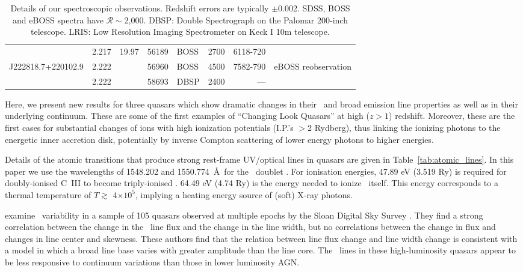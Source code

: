 \documentclass[fleqn,usenatbib]{mnras}
\begin{document}
\begin{table}
\begin{tabular}{l l   r ll  r r l}
                                      & 2.217                               & 19.97          &  56189                    &  BOSS                                    &  2700            &   6118-720          & \\
 J222818.7+220102.9   & 2.222                               &                    &  56960                     & BOSS                                    &  4500            &   7582-790          & eBOSS reobservation \\ 
                                     &  2.222                               &                    &  58693                    &  DBSP                                    & 2400             &    ---                        &    \\
    \hline \hline   
  \end{tabular}
  \caption{Details of our spectroscopic observations.  Redshift errors are
    typically $\pm$0.002.  SDSS, BOSS and eBOSS spectra have
    $\mathcal{R}\sim$2,000.  DBSP: Double Spectrograph on the Palomar
    200-inch telescope.  LRIS: Low Resolution Imaging Spectrometer on Keck
    I 10m telescope.} 
  \label{tab:obs_notes}
\end{table}

Here, we present new results for three quasars which show dramatic
changes in their \civ\ and \ciii broad emission line properties as
well as in their underlying continuum. These are some of the first
examples of ``Changing Look Quasars'' at high ($z>1$)
redshift. Moreover, these are the first cases for substantial changes
of ions with high ionization potentials (I.P.'s $>$2 Rydberg), thus
linking the ionizing photons to the energetic inner accretion disk,
potentially by inverse Compton scattering of lower energy photons to
higher energies.

Details of the atomic transitions that produce strong rest-frame
UV/optical lines in quasars are given in
Table~\ref{tab:atomic_lines}. In this paper we use the wavelengths of
1548.202 and 1550.774~\AA\ for the \civ\ doublet
\citep{Kramida2018}. For ionisation energies, 47.89 eV (3.519 Ry) is
required for doubly-ionised C~III to become triply-ionised \civ.
64.49 eV (4.74 Ry) is the energy needed to ionize \civ\ itself. This
energy corresponds to a thermal temperature of $T \gtrsim$
4$\times10^{5}$, implying a heating energy source of (soft) X-ray
photons. 

\citet{Wilhite2006} examine \civ\ variability in a sample
of 105 quasars observed at multiple epochs by the Sloan Digital Sky
Survey \citep[SDSS;][]{York2000, Stoughton2002, Abazajian2009}.  They
find a strong correlation between the change in the \civ\ line
flux and the change in the line width, but no correlations between the
change in flux and changes in line center and skewness.  These authors
find that the relation between line flux change and line width change
is consistent with a model in which a broad line base varies with
greater amplitude than the line core. The \civ\ lines in these
high-luminosity quasars appear to be less responsive to continuum
variations than those in lower luminosity AGN.
\end{document}
